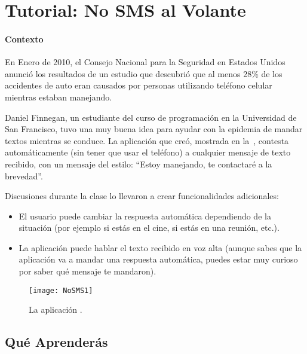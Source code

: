 

\section{Tutorial: No SMS al Volante}

\paragraph{Contexto} En Enero de 2010, el Consejo Nacional para la
Seguridad en Estados Unidos anunció los resultados de un estudio que
descubrió que al menos 28\% de los accidentes de auto eran causados
por personas utilizando teléfono celular mientras estaban manejando.

{Daniel Finnegan, un estudiante del curso de programación \AppInventor
  en la Universidad de San Francisco, tuvo una muy buena idea para
  ayudar con la epidemia de mandar textos mientras se conduce. La
  aplicación que creó, mostrada en la~, contesta
  automáticamente (sin tener que usar el teléfono) a cualquier mensaje
  de texto recibido, con un mensaje del estilo: ``Estoy manejando, te
  contactaré a la brevedad''.

 Discusiones durante la clase lo llevaron a crear funcionalidades adicionales:

\begin{itemize}

\item El usuario puede cambiar la respuesta automática dependiendo de
  la situación (por ejemplo si estás en el cine, si estás en una
  reunión, etc.).
\item La aplicación puede hablar el texto recibido en voz alta (aunque
  sabes que la aplicación va a mandar una respuesta automática, puedes
  estar muy curioso por saber qué mensaje te mandaron).
\end{itemize}

\begin{figure}[H]
\vspace{3em}
\centering
\texttt{[image: NoSMS1]}
\caption{La aplicación .}
\label{fig:NoSMS1}
\end{figure}


\subsection*{Qué Aprenderás}

}

